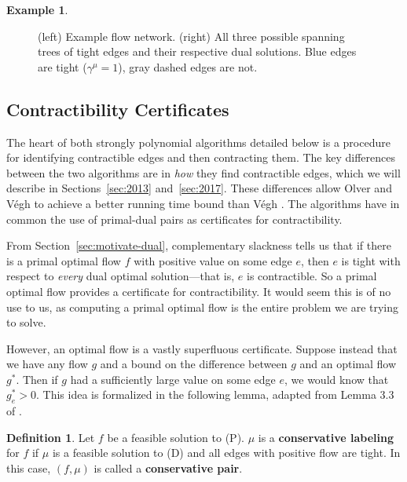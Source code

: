 \documentclass[11pt]{article}
\theoremstyle{definition}
\newtheorem{definition}{Definition}[section]
\theoremstyle{definition}
\theoremstyle{definition}
\newtheorem{example}{Example}[section]
\begin{document}
\begin{example}
\begin{figure}[h]
\begin{minipage}{.49\textwidth}
	\end{minipage}
	\label{fig:ex-spanning}
	\caption{(left) Example flow network. (right) All three possible 
	spanning trees of tight edges and their respective dual solutions.
	Blue edges are tight ($\gamma^{\mu} = 1$), gray dashed edges are not.}
	\end{figure}
	\end{example}
	
	
	\subsection{Contractibility Certificates} \label{sec:cert-contract}
	The heart of both strongly polynomial algorithms detailed below is a procedure for
	identifying contractible edges and then contracting them.
	The key differences between the two algorithms are in 
	\textit{how} they find contractible edges, which
	we will describe in Sections~\ref{sec:2013} and~\ref{sec:2017}. These differences
	allow Olver and Végh \cite{Olver2017} to achieve a better running time bound than
	Végh \cite{Vegh2013}. The algorithms have in common the use of primal-dual pairs
	as certificates for contractibility.

	From Section~\ref{sec:motivate-dual}, complementary slackness tells us that if there is a primal optimal flow
	$f$ with positive value
	on some edge $e$, then $e$ is tight with respect to \emph{every} dual
	optimal solution---that
	is, $e$ is contractible. So a primal optimal flow provides a certificate
	for contractibility.
	It would seem this is of no use to us, as computing a primal optimal flow is the entire
	problem we are trying to solve.
    
    However,
	an optimal flow is a vastly superfluous certificate.
	Suppose instead that we have any flow $g$ and a bound on the difference
	between $g$ and an optimal
	flow $g^*$. Then if $g$ had a sufficiently large value on some edge $e$, we would know that
	$g^*_e > 0$. This idea is formalized in the following lemma, adapted from Lemma 3.3 of
	\cite{Olver2017}.
	
  	\begin{definition} \label{def:conservative}
  	Let $f$ be a feasible solution to (P).
	$\mu$ is a \textbf{conservative labeling} for $f$ if $\mu$ is
	a feasible solution to (D) and all edges with positive flow are tight. In this case,
	$(f, \mu)$ is called a \textbf{conservative pair}.
	\end{definition}
\end{document}
